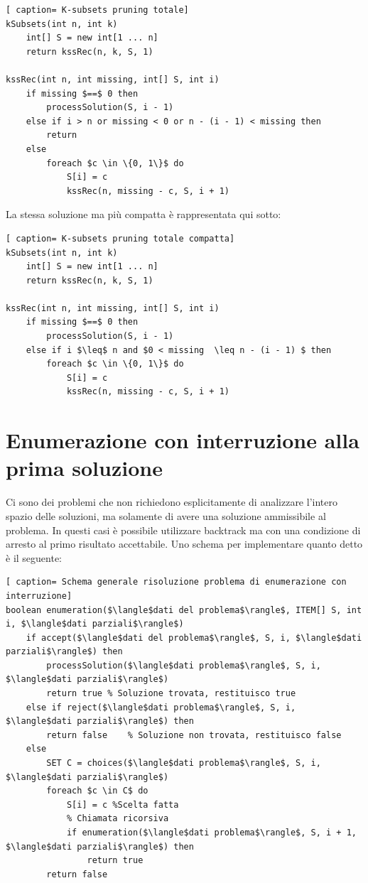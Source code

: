 \documentclass[../cheatSheetAlgoritmi.tex]{subfiles}
\begin{document}
 \begin{lstlisting}[ caption= K-subsets pruning totale]
kSubsets(int n, int k)
	int[] S = new int[1 ... n]
	return kssRec(n, k, S, 1)

kssRec(int n, int missing, int[] S, int i)
	if missing $==$ 0 then
		processSolution(S, i - 1)
	else if i > n or missing < 0 or n - (i - 1) < missing then
		return 
	else
		foreach $c \in \{0, 1\}$ do
			S[i] = c
			kssRec(n, missing - c, S, i + 1)
\end{lstlisting}
La stessa soluzione ma più compatta è rappresentata qui sotto:
 \begin{lstlisting}[ caption= K-subsets pruning totale compatta]
kSubsets(int n, int k)
	int[] S = new int[1 ... n]
	return kssRec(n, k, S, 1)

kssRec(int n, int missing, int[] S, int i)
	if missing $==$ 0 then
		processSolution(S, i - 1)
	else if i $\leq$ n and $0 < missing  \leq n - (i - 1) $ then
		foreach $c \in \{0, 1\}$ do
			S[i] = c
			kssRec(n, missing - c, S, i + 1)
\end{lstlisting}

\section{Enumerazione con interruzione alla prima soluzione}
Ci sono dei problemi che non richiedono esplicitamente di analizzare l'intero spazio delle soluzioni, ma solamente di avere una soluzione ammissibile al problema. In questi casi è possibile utilizzare backtrack ma con una condizione di arresto al primo risultato accettabile. Uno schema per implementare quanto detto è il seguente:
 \begin{lstlisting}[ caption= Schema generale risoluzione problema di enumerazione con interruzione]
boolean enumeration($\langle$dati del problema$\rangle$, ITEM[] S, int i, $\langle$dati parziali$\rangle$)
	if accept($\langle$dati del problema$\rangle$, S, i, $\langle$dati parziali$\rangle$) then
		processSolution($\langle$dati problema$\rangle$, S, i, $\langle$dati parziali$\rangle$)
		return true	% Soluzione trovata, restituisco true
	else if reject($\langle$dati problema$\rangle$, S, i, $\langle$dati parziali$\rangle$) then	
		return false	% Soluzione non trovata, restituisco false
	else
		SET C = choices($\langle$dati problema$\rangle$, S, i, $\langle$dati parziali$\rangle$)
		foreach $c \in C$ do
			S[i] = c %Scelta fatta
			% Chiamata ricorsiva
			if enumeration($\langle$dati problema$\rangle$, S, i + 1, $\langle$dati parziali$\rangle$) then
				return true
		return false
\end{lstlisting}
\end{document}
